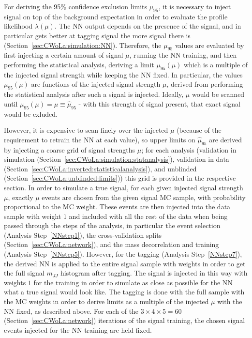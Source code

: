 For deriving the 95\% confidence exclusion limits $\mu_{95}$, it is necessary to inject signal on top of the background expectation in order to evaluate the profile likelihood $\lambda(\mu)$.
The NN output depends on the presence of the signal, and in particular gets better at tagging signal the more signal there is (Section~\ref{sec:CWoLa:simulation:NN}). 
Therefore, the $\mu_{95}$ values are evaluated by first injecting a certain amount of signal $\mu$, running the NN training, and then performing the statistical analysis, deriving a limit $\mu_{95}(\mu)$ which is a multiple of the injected signal strength while keeping the NN fixed. 
In particular, the values $\mu_{95}(\mu)$ are functions of the injected signal strength $\mu$, derived from performing the statistical analysis after such a signal is injected.
Ideally, $\mu$ would be scanned until $\mu_{95}(\mu)=\mu\equiv\hat{\mu}_{95}$ - with this strength of signal present, that exact signal would be exluded.

However, it is expensive to scan finely over the injected $\mu$ (because of the requirement to retrain the NN at each value), so upper limits on $\hat{\mu}_{95}$ are derived by injecting a coarse grid of signal strengths $\mu$; for each analysis (validation in simulation (Section~\ref{sec:CWoLa:simulation:statanalysis}), validation in data (Section~\ref{sec:CWoLa:inverted:statisticalanalysis}), and unblinded (Section~\ref{sec:CWoLa:unblinded:limits})) this grid is provided in the respective section.
In order to simulate a true signal, for each given injected signal strength $\mu$, exactly $\mu$ events are chosen from the given signal MC sample, with probability proportional to the MC weight.
These events are then injected into the data sample with weight $1$ and included with all the rest of the data when being passed through the steps of the analysis, in particular the event selection (Analysis Step~\ref{NNstep1}), the cross-validation splits (Section~\ref{sec:CWoLa:network}), and the mass decorrelation and training (Analysis Step~\ref{NNstep5}).
However, for the tagging (Analysis Step~\ref{NNstep7}), the derived NN is applied to the entire signal sample with weights in order to get the full signal $m_{JJ}$ histogram after tagging.
The signal is injected in this way with weights $1$ for the training in order to simulate as close as possible for the NN what a true signal would look like.
The tagging is done with the full sample with the MC weights in order to derive limits as a multiple of the injected $\mu$ with the NN fixed, as described above.
For each of the $3\times4\times5=60$ (Section~\ref{sec:CWoLa:network}) iterations of the signal training, the chosen signal events injected for the NN training are held fixed.

